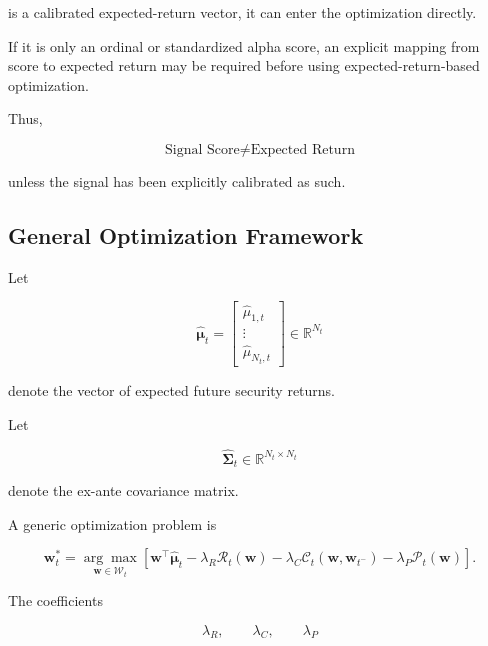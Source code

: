 \documentclass[11pt,a4paper]{article}
\begin{document}
is a calibrated expected-return vector, it can enter the optimization directly.

If it is only an ordinal or standardized alpha score, an explicit mapping from
score to expected return may be required before using expected-return-based
optimization.

Thus,

\begin{equation}
\boxed{
\text{Signal Score}
\neq
\text{Expected Return}
}
\end{equation}

unless the signal has been explicitly calibrated as such.


\subsection{General Optimization Framework}
\label{subsec:general_portfolio_optimization}

Let

\begin{equation}
\widehat{\boldsymbol{\mu}}_t
=
\begin{bmatrix}
\widehat{\mu}_{1,t}
\\
\vdots
\\
\widehat{\mu}_{N_t,t}
\end{bmatrix}
\in
\mathbb{R}^{N_t}
\end{equation}

denote the vector of expected future security returns.

Let

\begin{equation}
\widehat{\boldsymbol{\Sigma}}_t
\in
\mathbb{R}^{N_t\times N_t}
\end{equation}

denote the ex-ante covariance matrix.

A generic optimization problem is

\begin{equation}
\boxed{
\mathbf{w}_t^{*}
=
\underset{\mathbf{w}\in\mathcal{W}_t}{\arg\max}
\left[
\mathbf{w}^{\top}
\widehat{\boldsymbol{\mu}}_t
-
\lambda_R
\mathcal{R}_t(\mathbf{w})
-
\lambda_C
\mathcal{C}_t(\mathbf{w},\mathbf{w}_{t^-})
-
\lambda_P
\mathcal{P}_t(\mathbf{w})
\right].
}
\end{equation}

The coefficients

\begin{equation}
\lambda_R,
\qquad
\lambda_C,
\qquad
\lambda_P
\end{equation}
\end{document}

